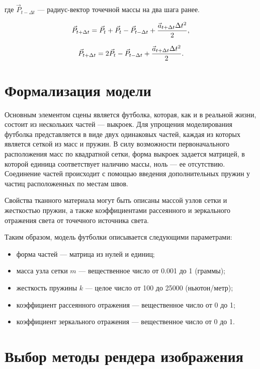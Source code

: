 где $\vec{P}_{t-\Delta t}$ --- радиус-вектор точечной массы на два шага ранее.

\begin{equation}\label{eq:12}
    \vec{P}_{t+\Delta t} = \vec{P}_{t} + \vec{P}_{t} - \vec{P}_{t-\Delta t} +
    \frac{\vec{a}_{t+\Delta t}\Delta{t}^2}{2}, \\
\end{equation}

\begin{equation}\label{eq:13}
    \vec{P}_{t+\Delta t} = 2\vec{P}_{t} - \vec{P}_{t-\Delta t} +
    \frac{\vec{a}_{t+\Delta t}\Delta{t}^2}{2}. \\
\end{equation}

\section{Формализация модели}

Основным элементом сцены является футболка, которая, как и в реальной
жизни, состоит из нескольких частей --- выкроек. Для упрощения моделирования
футболка представляется в виде двух одинаковых частей, каждая из которых
является сеткой из масс и пружин. В силу возможности первоначального
расположения масс по квадратной сетки, форма выкроек задается матрицей, в
которой единица соответствует наличию массы, ноль --- ее отсутствию. Соединение
частей происходит с помощью введения дополнительных пружин у частиц
расположенных по местам швов.

Свойства тканного материала могут быть описаны массой узлов сетки и жесткостью
пружин, а также коэффициентами рассеянного и зеркального отражения света
от точечного источника света.

Таким образом, модель футболки описывается следующими параметрами:
\begin{itemize}
    \item форма частей --- матрица из нулей и единиц;
    \item масса узла сетки $m$ --- вещественное число от 0.001 до 1 (граммы);
    \item жесткость пружины $k$ --- целое число от 100 до 25000 (ньютон/метр);
    \item коэффициент рассеянного отражения --- вещественное число от 0 до 1;
    \item коэффициент зеркального отражения --- вещественное число от 0 до 1.
\end{itemize}

\section{Выбор методы рендера изображения}

